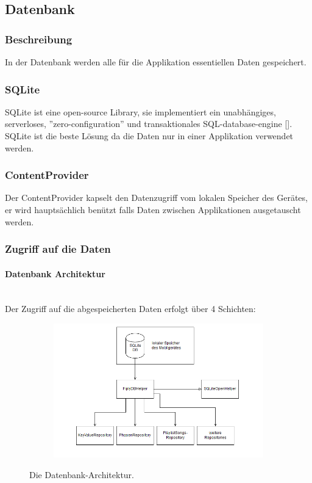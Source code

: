 \documentclass[FIPLY_base.tex]{subfiles}
\begin{document}
\subsection{ Datenbank}
\subsubsection{Beschreibung}
In der Datenbank werden alle für die Applikation essentiellen Daten gespeichert.

\subsubsection{SQLite}
SQLite ist eine open-source Library, sie implementiert ein unabhängiges, serverloses, ''zero-configuration'' und transaktionales SQL-database-engine [\cite{dbSQLite}]. SQLite ist die beste Lösung da die Daten nur in einer Applikation verwendet werden.

\subsubsection{ContentProvider}
Der ContentProvider kapselt den Datenzugriff vom lokalen Speicher des Gerätes, er wird hauptsächlich benützt falls Daten zwischen Applikationen ausgetauscht werden. 

\subsubsection{Zugriff auf die Daten}


\paragraph{Datenbank Architektur}\ \\
Der Zugriff auf die abgespeicherten Daten erfolgt über 4 Schichten:

\begin{figure}[H]
	\begin{subfigure}[b]{0.3\textwidth}
	\includegraphics[scale=0.4]{img/Database_architecture}
	\end{subfigure}
	\hfil
	\caption{Die Datenbank-Architektur.}
\end{figure}
\end{document}
